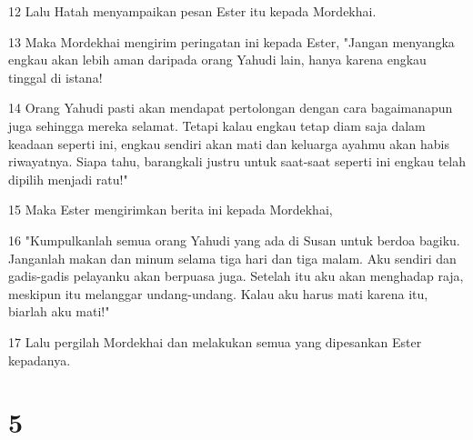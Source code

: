 \par 12 Lalu Hatah menyampaikan pesan Ester itu kepada Mordekhai.
\par 13 Maka Mordekhai mengirim peringatan ini kepada Ester, "Jangan menyangka engkau akan lebih aman daripada orang Yahudi lain, hanya karena engkau tinggal di istana!
\par 14 Orang Yahudi pasti akan mendapat pertolongan dengan cara bagaimanapun juga sehingga mereka selamat. Tetapi kalau engkau tetap diam saja dalam keadaan seperti ini, engkau sendiri akan mati dan keluarga ayahmu akan habis riwayatnya. Siapa tahu, barangkali justru untuk saat-saat seperti ini engkau telah dipilih menjadi ratu!"
\par 15 Maka Ester mengirimkan berita ini kepada Mordekhai,
\par 16 "Kumpulkanlah semua orang Yahudi yang ada di Susan untuk berdoa bagiku. Janganlah makan dan minum selama tiga hari dan tiga malam. Aku sendiri dan gadis-gadis pelayanku akan berpuasa juga. Setelah itu aku akan menghadap raja, meskipun itu melanggar undang-undang. Kalau aku harus mati karena itu, biarlah aku mati!"
\par 17 Lalu pergilah Mordekhai dan melakukan semua yang dipesankan Ester kepadanya.

\chapter{5}

